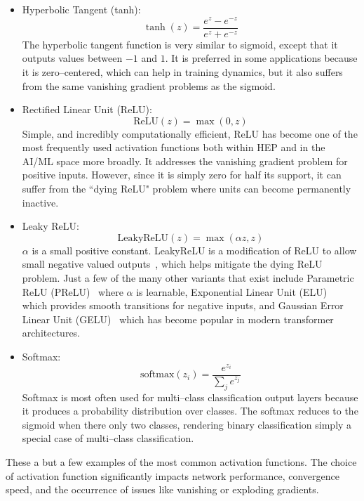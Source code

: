 \begin{itemize}
                \item Hyperbolic Tangent (tanh): \[\tanh(z) = \frac{e^z - e^{-z}}{e^z + e^{-z}}\]
                    The hyperbolic tangent function is very similar to sigmoid, except that it outputs values between \(-1\) and \(1\).
                    It is preferred in some applications because it is zero--centered, which can help in training dynamics, but it also suffers from the same vanishing gradient problems as the sigmoid.
                \item Rectified Linear Unit (ReLU): \[\text{ReLU}(z) = \max(0, z)\]
                    Simple, and incredibly computationally efficient, ReLU has become one of the most frequently used activation functions both within HEP and in the AI/ML space more broadly.
                    It addresses the vanishing gradient problem for positive inputs.
                    However, since it is simply zero for half its support, it can suffer from the ``dying ReLU" problem where units can become permanently inactive.
                \item Leaky ReLU: \[\text{LeakyReLU}(z) = \max(\alpha z, z)\]
                    \(\alpha\) is a small positive constant.
                    LeakyReLU is a modification of ReLU to allow small negative valued outputs~\cite{Maas2013RectifierModels}, which helps mitigate the dying ReLU problem.
                    Just a few of the many other variants that exist include Parametric ReLU (PReLU)~\cite{he_delving_2015} where \(\alpha\) is learnable, Exponential Linear Unit (ELU)~\cite{clevert_fast_2016} which provides smooth transitions for negative inputs, and Gaussian Error Linear Unit (GELU)~\cite{hendrycks_gaussian_2023} which has become popular in modern transformer architectures.

                \item Softmax: \[\text{softmax}(z_i) = \frac{e^{z_i}}{\sum_{j} e^{z_j}}\]
                        Softmax is most often used for multi--class classification output layers because it produces a probability distribution over classes.
                        The softmax reduces to the sigmoid when there only two classes, rendering binary classification simply a special case of multi--class classification.
            \end{itemize}
            These a but a few examples of the most common activation functions.
            The choice of activation function significantly impacts network performance, convergence speed, and the occurrence of issues like vanishing or exploding gradients.
